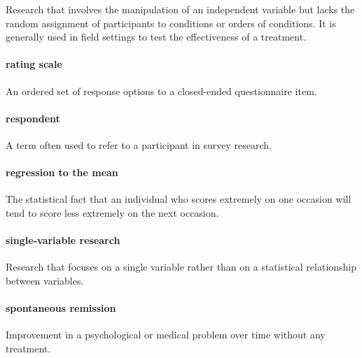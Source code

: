 \documentclass[
]{krantz}
\begin{document}
Research that involves the manipulation of an independent variable but lacks the random assignment of participants to conditions or orders of conditions. It is generally used in field settings to test the effectiveness of a treatment.

\hypertarget{rating-scale}{%
\paragraph*{rating scale}\label{rating-scale}}

An ordered set of response options to a closed-ended questionnaire item.

\hypertarget{respondent}{%
\paragraph*{respondent}\label{respondent}}

A term often used to refer to a participant in survey research.

\hypertarget{regression-to-the-mean}{%
\paragraph*{regression to the mean}\label{regression-to-the-mean}}

The statistical fact that an individual who scores extremely on one occasion will tend to score less extremely on the next occasion.

\hypertarget{single-variable-research}{%
\paragraph*{single-variable research}\label{single-variable-research}}

Research that focuses on a single variable rather than on a statistical relationship between variables.

\hypertarget{spontaneous-remission}{%
\paragraph*{spontaneous remission}\label{spontaneous-remission}}

Improvement in a psychological or medical problem over time without any treatment.
\end{document}
